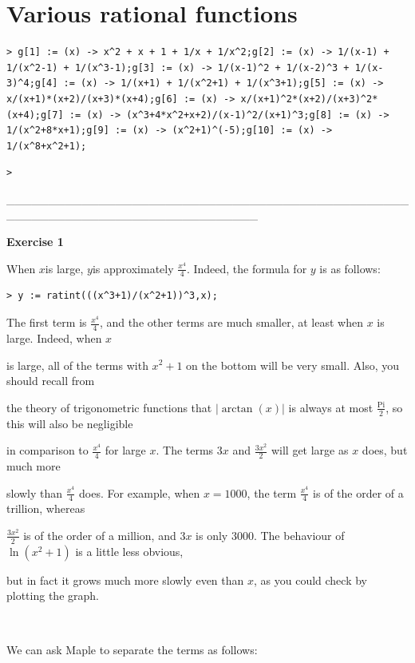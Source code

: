 \documentclass{article}
\begin{document}
\section{\textbf{Various rational functions}}
\begin{lstlisting}
> g[1] := (x) -> x^2 + x + 1 + 1/x + 1/x^2;g[2] := (x) -> 1/(x-1) + 1/(x^2-1) + 1/(x^3-1);g[3] := (x) -> 1/(x-1)^2 + 1/(x-2)^3 + 1/(x-3)^4;g[4] := (x) -> 1/(x+1) + 1/(x^2+1) + 1/(x^3+1);g[5] := (x) -> x/(x+1)*(x+2)/(x+3)*(x+4);g[6] := (x) -> x/(x+1)^2*(x+2)/(x+3)^2*(x+4);g[7] := (x) -> (x^3+4*x^2+x+2)/(x-1)^2/(x+1)^3;g[8] := (x) -> 1/(x^2+8*x+1);g[9] := (x) -> (x^2+1)^(-5);g[10] := (x) -> 1/(x^8+x^2+1);
\end{lstlisting}
\begin{lstlisting}
> 
\end{lstlisting}
\begin{Maple Normal}
\_\_\_\_\_\_\_\_\_\_\_\_\_\_\_\_\_\_\_\_\_\_\_\_\_\_\_\_\_\_\_\_\_\_\_\_\_\_\_\_\_\_\_\_\_\_\_\_\_\_\_\_\_\_\_\_\_\_\_\_\_\_\_\_\_\_\_\_\_\_\_\_\_\_\_\_\_\_
\end{Maple Normal}
\begin{Maple Heading 2}
\textbf{Exercise 1}
\end{Maple Heading 2}
\begin{Maple Normal}
When 
$x$is large, 
$y$is approximately 
$\frac{x^{4}}{4}$.  Indeed, the formula for 
$y$ is as follows:
\end{Maple Normal}
\begin{lstlisting}
> y := ratint(((x^3+1)/(x^2+1))^3,x);
\end{lstlisting}
\begin{Maple Normal}
The first term is 
$\frac{x^{4}}{4}$, and the other terms are much smaller, at least when 
$x$ is large.  Indeed, when 
$x$\

is large, all of the terms with 
$x^{2}+1$ on the bottom will be very small.  Also, you should recall from\

the theory of trigonometric functions that 
${| \arctan (x)|}$ is always at most 
$\frac{\mathrm{Pi}}{2}$, so this will also be negligible\

in comparison to 
$\frac{x^{4}}{4}$ for large 
$x$.  The terms 
$3 x$ and 
$\frac{3 x^{2}}{2}$ will get large as 
$x$ does, but much more \

slowly than 
$\frac{x^{4}}{4}$ does.  For example, when 
$x =1000$, the term 
$\frac{x^{4}}{4}$ is of the order of a trillion, whereas \


$\frac{3 x^{2}}{2}$ is of the order of a million, and 
$3 x$ is only 
$3000$.  The behaviour of 
$\ln (x^{2}+1)$ is a little less obvious,\

but in fact it grows much more slowly even than 
$x$, as you could check by plotting the graph.\

\

We can ask Maple to separate the terms as follows:
\end{Maple Normal}
\end{document}
